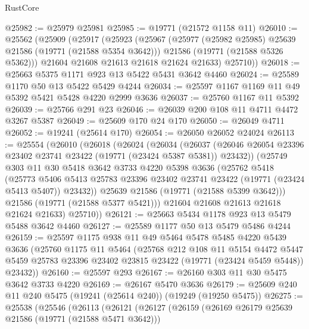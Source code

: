 \begin{lexlean}{RustCore}
\begin{coremodule}
@25982 := @25979 @25981
@25985 := @19771 (@21572 @1158 @11)
@26010 := @25562
    (@25909
      (@25917
        (@25923
          (@25967
            (@25977 (@25982 @25985) @25639 @21586 (@19771 (@21588 @5354 @3642)))
            @21586
            (@19771 (@21588 @5326 @5362)))
          @21604
          @21608
          @21613
          @21618
          @21624
          @21633)
        @25710))
@26018 := @25663 @5375 @1171 @923 @13 @5422 @5431 @3642 @4460
@26024 := @25589 @1170 @50 @13 @5422 @5429 @4244
@26034 := @25597 @1167 @1169 @11 @49 @5392 @5421 @5428 @4220 @2999 @3636
@26037 := @25760 @1167 @11 @5392
@26039 := @25766 @291 @23
@26046 := @26039 @200 @108 @11 @4711 @4472 @3267 @5387
@26049 := @25609 @170 @24 @170
@26050 := @26049 @4711
@26052 := @19241 (@25614 @170)
@26054 := @26050 @26052 @24024
@26113 := @25554
    (@26010
      (@26018
        (@26024
          (@26034
            (@26037
              (@26046 @26054 @23396 @23402 @23741 @23422 (@19771 (@23424 @5387 @5381)) @23432))
            (@25749
              @303
              @11
              @30
              @5418
              @3642
              @3733
              @4220
              @5398
              @3636
              (@25762
                @5418
                (@25773
                  @5406
                  @5413
                  @25783
                  @23396
                  @23402
                  @23741
                  @23422
                  (@19771 (@23424 @5413 @5407))
                  @23432))
              @25639
              @21586
              (@19771 (@21588 @5399 @3642)))
            @21586
            (@19771 (@21588 @5377 @5421)))
          @21604
          @21608
          @21613
          @21618
          @21624
          @21633)
        @25710))
@26121 := @25663 @5434 @1178 @923 @13 @5479 @5488 @3642 @4460
@26127 := @25589 @1177 @50 @13 @5479 @5486 @4244
@26159 := @25597
    @1175
    @938
    @11
    @49
    @5464
    @5478
    @5485
    @4220
    @5439
    @3636
    (@25760
      @1175
      @11
      @5464
      (@25768
        @212
        @108
        @11
        @5154
        @4472
        @5447
        @5459
        @25783
        @23396
        @23402
        @23815
        @23422
        (@19771 (@23424 @5459 @5448))
        @23432))
@26160 := @25597 @293
@26167 := @26160 @303 @11 @30 @5475 @3642 @3733 @4220
@26169 := @26167 @5470 @3636
@26179 := @25609 @240 @11 @240 @5475 (@19241 (@25614 @240)) (@19249 (@19250 @5475))
@26275 := @25538
    (@25546
      (@26113
        (@26121
          (@26127
            (@26159
              (@26169 @26179 @25639 @21586 (@19771 (@21588 @5471 @3642)))

\end{coremodule}
\end{lexlean}
